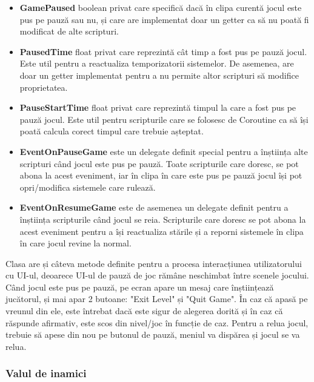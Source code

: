 \documentclass[12pt, a4paper]{article}
\begin{document}
	\begin{itemize}
		\item \textbf{GamePaused} boolean privat care specifică dacă în clipa curentă jocul este pus pe pauză sau nu, și care are implementat doar un getter ca să nu poată fi modificat de alte scripturi.
		\item \textbf{PausedTime} float privat care reprezintă cât timp a fost pus pe pauză jocul. Este util pentru a reactualiza temporizatorii sistemelor. De asemenea, are doar un getter implementat pentru a nu permite altor scripturi să modifice proprietatea.
		\item \textbf{PauseStartTime} float privat care reprezintă timpul la care a fost pus pe pauză jocul. Este util pentru scripturile care se folosesc de Coroutine ca să își poată calcula corect timpul care trebuie așteptat.
		\item \textbf{EventOnPauseGame} este un delegate definit special pentru a înștiința alte scripturi când jocul este pus pe pauză. Toate scripturile care doresc, se pot abona la acest eveniment, iar în clipa în care este pus pe pauză jocul își pot opri/modifica sistemele care rulează.
		\item \textbf{EventOnResumeGame} este de asemenea un delegate definit pentru a înștiința scripturile când jocul se reia. Scripturile care doresc se pot abona la acest eveniment pentru a își reactualiza stările și a reporni sistemele în clipa în care jocul revine la normal.
	\end{itemize}
	
	Clasa are și câteva metode definite pentru a procesa interacțiunea utilizatorului cu UI-ul, deoarece UI-ul de pauză de joc rămâne neschimbat între scenele jocului. Când jocul este pus pe pauză, pe ecran apare un mesaj care înștiințează jucătorul, și mai apar 2 butoane: "Exit Level" și "Quit Game". În caz că apasă pe vreunul din ele, este întrebat dacă este sigur de alegerea dorită și în caz că răspunde afirmativ, este scos din nivel/joc în funcție de caz. Pentru a relua jocul, trebuie să apese din nou pe butonul de pauză, meniul va dispărea și jocul se va relua.
	
	
	
	
	
	\subsubsection{Valul de inamici}
	\label{section: enemyWave}
	
\end{document}
